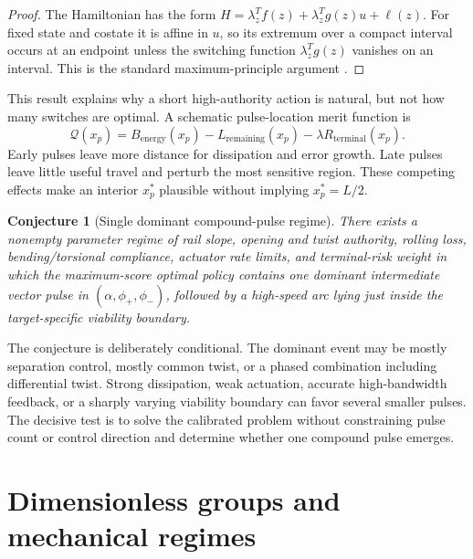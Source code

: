 \documentclass[11pt]{article}
\numberwithin{equation}{section}
\newtheorem{conjecture}[proposition]{Conjecture}
\theoremstyle{definition}
\theoremstyle{remark}
\begin{document}
\begin{proof}
The Hamiltonian has the form
$H=\lambda_z^Tf(z)+\lambda_z^Tg(z)u+\ell(z)$.  For fixed state and costate it is affine in $u$, so its extremum over a compact interval occurs at an endpoint unless the switching function $\lambda_z^Tg(z)$ vanishes on an interval.  This is the standard maximum-principle argument \citep{Pontryagin1962}.
\end{proof}

This result explains why a short high-authority action is natural, but not how many switches are optimal.  A schematic pulse-location merit function is
\begin{equation}
  \mathcal Q(x_p)
  =B_{\mathrm{energy}}(x_p)
  -L_{\mathrm{remaining}}(x_p)
  -\lambda R_{\mathrm{terminal}}(x_p).
  \label{eq:pulsevalue}
\end{equation}
Early pulses leave more distance for dissipation and error growth.  Late pulses leave little useful travel and perturb the most sensitive region.  These competing effects make an interior $x_p^*$ plausible without implying $x_p^*=L/2$.

\begin{conjecture}[Single dominant compound-pulse regime]
\label{conj:onepulse}
There exists a nonempty parameter regime of rail slope, opening and twist authority, rolling loss, bending/torsional compliance, actuator rate limits, and terminal-risk weight in which the maximum-score optimal policy contains one dominant intermediate vector pulse in $(\alpha,\phi_+,\phi_-)$, followed by a high-speed arc lying just inside the target-specific viability boundary.
\end{conjecture}

The conjecture is deliberately conditional.  The dominant event may be mostly separation control, mostly common twist, or a phased combination including differential twist.  Strong dissipation, weak actuation, accurate high-bandwidth feedback, or a sharply varying viability boundary can favor several smaller pulses.  The decisive test is to solve the calibrated problem without constraining pulse count or control direction and determine whether one compound pulse emerges.

\section{Dimensionless groups and mechanical regimes}
\end{document}
